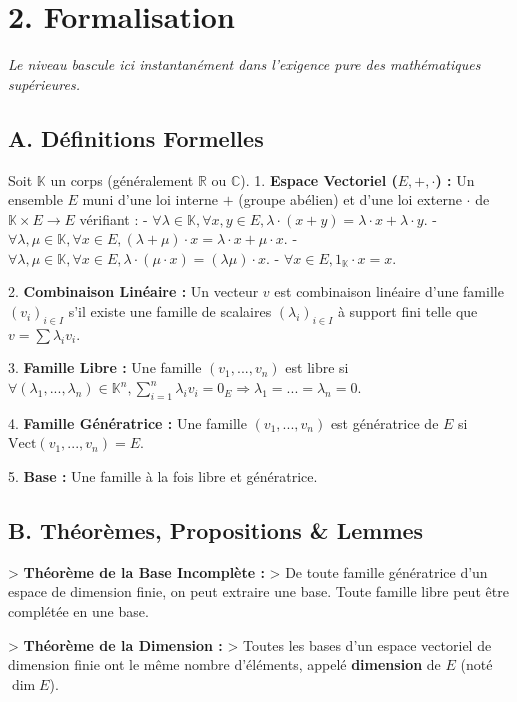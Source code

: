 \documentclass{report}
\begin{document}
\section*{2. Formalisation}
\textit{Le niveau bascule ici instantanément dans l'exigence pure des mathématiques supérieures.}

\subsection*{A. Définitions Formelles}
Soit $\mathbb{K}$ un corps (généralement $\mathbb{R}$ ou $\mathbb{C}$).
1. \textbf{Espace Vectoriel ($E, +, \cdot$) :} Un ensemble $E$ muni d'une loi interne $+$ (groupe abélien) et d'une loi externe $\cdot$ de $\mathbb{K} \times E \to E$ vérifiant :
   - $\forall \lambda \in \mathbb{K}, \forall x, y \in E, \lambda \cdot (x + y) = \lambda \cdot x + \lambda \cdot y$.
   - $\forall \lambda, \mu \in \mathbb{K}, \forall x \in E, (\lambda + \mu) \cdot x = \lambda \cdot x + \mu \cdot x$.
   - $\forall \lambda, \mu \in \mathbb{K}, \forall x \in E, \lambda \cdot (\mu \cdot x) = (\lambda \mu) \cdot x$.
   - $\forall x \in E, 1_{\mathbb{K}} \cdot x = x$.

2. \textbf{Combinaison Linéaire :} Un vecteur $v$ est combinaison linéaire d'une famille $(v_i)_{i \in I}$ s'il existe une famille de scalaires $(\lambda_i)_{i \in I}$ à support fini telle que $v = \sum \lambda_i v_i$.

3. \textbf{Famille Libre :} Une famille $(v_1, ..., v_n)$ est libre si $\forall (\lambda_1, ..., \lambda_n) \in \mathbb{K}^n, \sum_{i=1}^n \lambda_i v_i = 0_E \Rightarrow \lambda_1 = ... = \lambda_n = 0$.

4. \textbf{Famille Génératrice :} Une famille $(v_1, ..., v_n)$ est génératrice de $E$ si $\text{Vect}(v_1, ..., v_n) = E$.

5. \textbf{Base :} Une famille à la fois libre et génératrice.

\subsection*{B. Théorèmes, Propositions \& Lemmes}
> \textbf{Théorème de la Base Incomplète :}
> De toute famille génératrice d'un espace de dimension finie, on peut extraire une base. Toute famille libre peut être complétée en une base.

> \textbf{Théorème de la Dimension :}
> Toutes les bases d'un espace vectoriel de dimension finie ont le même nombre d'éléments, appelé \textbf{dimension} de $E$ (noté $\dim E$).
\end{document}
